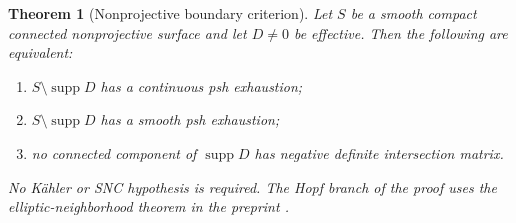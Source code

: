 \documentclass[11pt]{amsart}
\newtheorem{theorem}{Theorem}[section]
\theoremstyle{definition}
\theoremstyle{remark}
\numberwithin{equation}{section}
\newcommand{\supp}{\operatorname{supp}}
\begin{document}
\begin{theorem}[Nonprojective boundary criterion]\label{thm:nonprojective}
Let $S$ be a smooth compact connected nonprojective surface and let
$D\ne0$ be effective. Then the following are equivalent:
\begin{enumerate}[label=\textup{(\roman*)},leftmargin=2.5em]
\item $S\setminus\supp D$ has a continuous psh exhaustion;
\item $S\setminus\supp D$ has a smooth psh exhaustion;
\item no connected component of $\supp D$ has negative definite
intersection matrix.
\end{enumerate}
No K\"ahler or SNC hypothesis is required. The Hopf branch of the
proof uses the elliptic-neighborhood theorem in the preprint
\cite[Theorem~1.6]{CFSTZ2026}.
\end{theorem}
\end{document}
